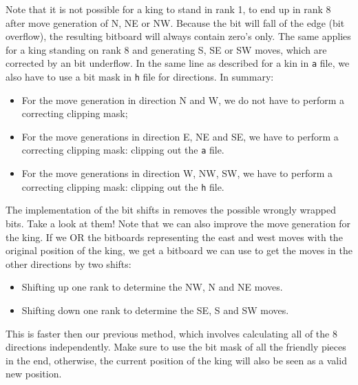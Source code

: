 %
Note that it is not possible for a king to stand in rank 1, to end up in rank 8 after move generation of N, NE or NW. 
Because the bit will fall of the edge (bit overflow), the resulting bitboard will always contain zero's only.
The same applies for a king standing on rank 8 and generating S, SE or SW moves, which are corrected by an bit underflow.
In the same line as described for a kin in \texttt{a} file, we also have to use a bit mask in \texttt{h} file for directions.
In summary:
%
\begin{itemize}
	\item For the move generation in direction N and W, we do not have to perform a correcting clipping mask;
	
	\item For the move generations in direction E, NE and SE, we have to perform a correcting clipping mask: clipping out the \texttt{a} file.
	
	\item For the move generations in direction W, NW, SW, we have to perform a correcting clipping mask:
	clipping out the \texttt{h} file.
\end{itemize}
%
The implementation of the bit shifts in  removes the possible wrongly wrapped bits. Take a look at them!
Note that we can also improve the move generation for the king.
If we OR the bitboards representing the east and west moves with the original position of the king,
we get a bitboard we can use to get the moves in the other directions by two shifts:
%
\begin{itemize}
	\item Shifting up one rank to determine the NW, N and NE moves.
	\item Shifting down one rank to determine the SE, S and SW moves.
\end{itemize}
%
This is faster then our previous method, which involves calculating all of the 8 directions independently.
Make sure to use the bit mask of all the friendly pieces in the end, otherwise, the current position of the king will also be seen as a valid new position.
